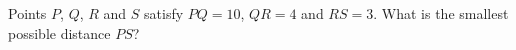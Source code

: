 Points $P$, $Q$, $R$ and $S$ satisfy $PQ=10$, $QR=4$ and $RS=3$. What is the smallest possible distance $PS$?
